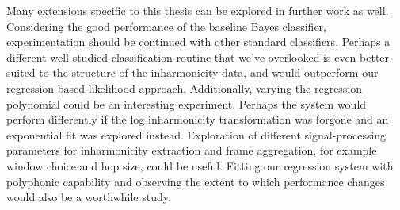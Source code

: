 \documentclass[12pt]{cmuthesis}
\begin{document}
Many extensions specific to this thesis can be explored in further work as well. Considering the good performance of the baseline Bayes classifier, experimentation should be continued with other standard classifiers. Perhaps a different well-studied classification routine that we've overlooked is even better-suited to the structure of the inharmonicity data, and would outperform our regression-based likelihood approach. Additionally, varying the regression polynomial could be an interesting experiment. Perhaps the system would perform differently if the log inharmonicity transformation was forgone and an exponential fit was explored instead. Exploration of different signal-processing parameters for inharmonicity extraction and frame aggregation, for example window choice and hop size, could be useful. Fitting our regression system with polyphonic capability and observing the extent to which performance changes would also be a worthwhile study.



\end{document}
